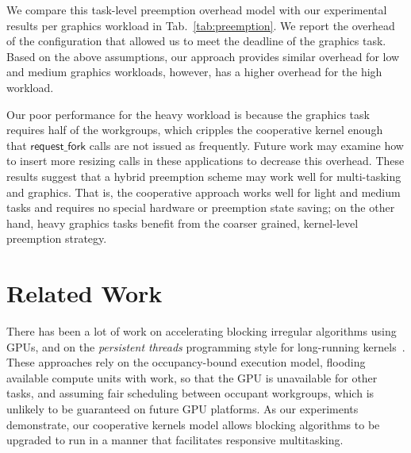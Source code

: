 \documentclass[sigconf]{acmart}
\newcommand{\mytab}{Tab.~}
\newcommand{\offerfork}{\mathsf{request\_fork}}
\begin{document}
{We compare this task-level preemption overhead model with our
experimental results per graphics workload in
\mytab{\ref{tab:preemption}}. We report the overhead of the
configuration that allowed us to meet the deadline of the graphics
task.
%
Based on the above assumptions, our approach provides similar overhead
for low and medium graphics workloads, however, has a higher overhead for
the high workload.

Our poor performance for the heavy workload is because the graphics
task requires half of the workgroups, which cripples the cooperative
kernel enough that $\offerfork$ calls are not issued as frequently.
Future work may examine how to insert more resizing calls in these
applications to decrease this overhead.
%
These results suggest that a hybrid preemption scheme may work well
for multi-tasking and graphics. That is, the cooperative approach
works well for light and medium tasks and requires no special hardware
or preemption state saving; on the other hand, heavy graphics tasks
benefit from the coarser grained, kernel-level preemption strategy.

\section{Related Work}\label{sec:relatedwork}

%
There has been a lot of work on accelerating blocking irregular
algorithms using GPUs, and on the \emph{persistent threads}
programming style for long-running
kernels~\cite{owens-persistent,DBLP:conf/ipps/KaleemVPHP16,DBLP:conf/ipps/DavidsonBGO14,DBLP:conf/hipc/HarishN07,DBLP:journals/topc/MerrillGG15,DBLP:conf/egh/VineetHPN09,DBLP:conf/ppopp/NobariCKB12,DBLP:conf/hpcc/SolomonTT10a,DBLP:conf/popl/PrabhuRMH11,DBLP:conf/ppopp/Mendez-LojoBP12,DBLP:conf/oopsla/PaiP16,DBLP:conf/oopsla/SorensenDBGR16,DBLP:conf/egh/CedermanT08,TPO10,BNP12,Pannotia}.
These approaches rely on the occupancy-bound execution model, flooding
available compute units with work, so that the GPU is unavailable for
other tasks, and assuming fair scheduling between occupant workgroups,
which is unlikely to be guaranteed on future GPU platforms.
%
As our experiments demonstrate, our cooperative kernels model allows blocking algorithms
to be upgraded to run in a manner that facilitates responsive multitasking.


}
\end{document}
